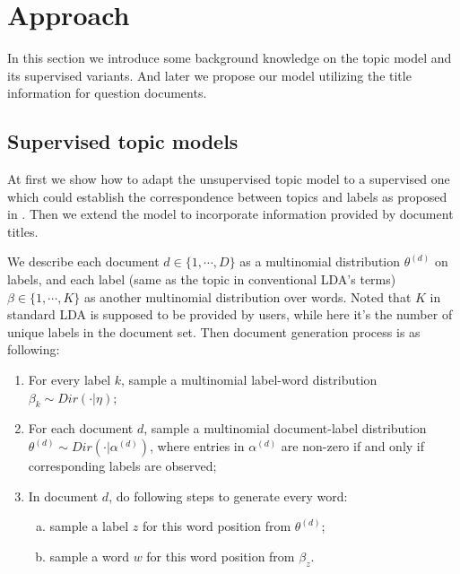 \section{Approach}
\label{sec:approach}

In this section we introduce some background knowledge on the topic model and its supervised variants. And later we propose our model utilizing the title information for question documents. 



\subsection{Supervised topic models}

At first we show how to adapt the unsupervised topic model to a supervised one which could establish the correspondence between topics and labels as proposed in \cite{ramage2009labeled}. Then we extend the model to incorporate information provided by document titles. 

We describe each document $d \in \{1,\cdots,D\}$ as a multinomial distribution $\theta^{(d)}$ on labels, and each label (same as the topic in conventional LDA's terms) $\beta \in \{1,\cdots,K\}$ as another multinomial distribution over words. Noted that $K$ in standard LDA is supposed to be provided by users, while here it's the number of unique labels in the document set. Then document generation process is as following:

\begin{enumerate}[1.]
\item For every label $k$, sample a multinomial label-word distribution $\beta_k \sim Dir(\cdot|\eta)$;
\item For each document $d$, sample a multinomial document-label distribution $\theta^{(d)} \sim Dir(\cdot|\alpha^{(d)})$, where entries in $\alpha^{(d)}$ are non-zero if and only if corresponding labels are observed;
\item In document $d$, do following steps to generate every word:
  \begin{enumerate}[(a)]
  \item sample a label $z$ for this word position from $\theta^{(d)}$;
  \item sample a word $w$ for this word position from $\beta_z$.
  \end{enumerate}
\end{enumerate}

